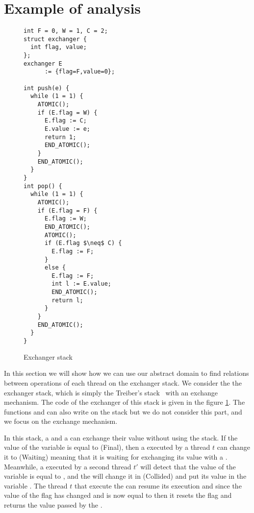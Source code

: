 \section{Example of analysis}
\label{sec:example}

\begin{figure}
\begin{multicols}{2}
\begin{lstlisting}
int F = 0, W = 1, C = 2;
struct exchanger {
  int flag, value;
};
exchanger E 
      := {flag=F,value=0};

int push(e) {
  while (1 = 1) {
    ATOMIC();
    if (E.flag = W) {
      E.flag := C;
      E.value := e;
      return 1;
      END_ATOMIC();
    }
    END_ATOMIC();
  }
}
int pop() {
  while (1 = 1) {
    ATOMIC();
    if (E.flag = F) {
      E.flag := W;
      END_ATOMIC();
      ATOMIC();
      if (E.flag $\neq$ C) {
        E.flag := F;
      }
      else {
        E.flag := F;
        int l := E.value;
        END_ATOMIC();
        return l;
      }
    }
    END_ATOMIC();
  }
}
\end{lstlisting}
\end{multicols}
\caption{Exchanger stack}
\label{fig:exchangerstack}
\end{figure}


In this section we will show how we can use our abstract domain to find relations between operations of each thread on the exchanger stack. We consider the the exchanger stack, which is simply the Treiber's stack~\cite{DBLP:conf/spaa/HendlerSY04} with an exchange mechanism. The code of the exchanger of this stack is given in the figure \ref{fig:exchangerstack}. 
The functions  and  can also write on the stack but we do not consider this part, and we focus on the exchange mechanism.

In this stack, a  and a  can exchange their value without using the stack. If the value of the variable  is equal to  (Final), then a  executed by a thread $t$ can change it to  (Waiting) meaning that it is waiting for exchanging its value with a . 
Meanwhile, a  executed by a second thread $t'$ will detect that the value of the  variable is equal to , and the  will change it in  (Collided) and put its value  in the variable . 
The thread $t$ that execute the  can resume its execution and since the value of the flag has changed and is now equal to  then it resets the flag and returns the value passed by the . 

